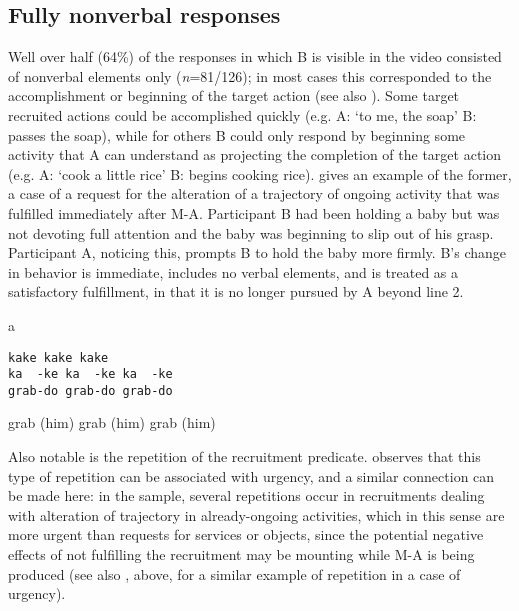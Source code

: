 \documentclass[output=paper]{langsci/langscibook}
\begin{document}
\subsection{Fully nonverbal responses}\label{sec:floyd:4.1}

Well over half (64\%) of the responses in which B is visible in the video consisted of nonverbal elements only (\textit{n}=81/126); in most cases this corresponded to the accomplishment or beginning of the target action (see also \citealt{RauniomaaKeisanen2012}). Some target recruited actions could be accomplished quickly (e.g. A: ‘to me, the soap’ B: passes the soap), while for others B could only respond by beginning some activity that A can understand as projecting the completion of the target action (e.g. A: ‘cook a little rice’ B: begins cooking rice).  gives an example of the former, a case of a request for the alteration of a trajectory of ongoing activity that was fulfilled immediately after M-A. Participant B had been holding a baby but was not devoting full attention and the baby was beginning to slip out of his grasp. Participant A, noticing this, prompts B to hold the baby more firmly. B's change in behavior is immediate, includes no verbal elements, and is treated as a satisfactory fulfillment, in that it is no longer pursued by A beyond line 2.

\vspace{-1mm}
%
\begin{mdframednoverticalspace}[style=firstfoc]
\begin{transbox}{1}{a}
\begin{verbatim}
kake kake kake
ka  -ke ka  -ke ka  -ke
grab-do grab-do grab-do
\end{verbatim}
grab (him) grab (him) grab (him)
\end{transbox}
\end{mdframednoverticalspace}
%
\begin{mdframednoverticalspace}[style=secondfoc]
\end{mdframednoverticalspace}

Also notable is the repetition of the recruitment predicate. \citet{Stivers2004} observes that this type of repetition can be associated with urgency, and a similar connection can be made here: in the sample, several repetitions occur in recruitments dealing with alteration of trajectory in already-ongoing activities, which in this sense are more urgent than requests for services or objects, since the potential negative effects of not fulfilling the recruitment may be mounting while M-A is being produced (see also , above, for a similar example of repetition in a case of urgency).
\end{document}
